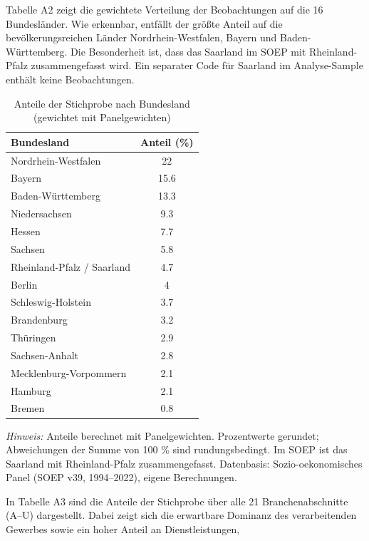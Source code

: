 Tabelle A2 zeigt die gewichtete Verteilung der Beobachtungen auf die 16 Bundesländer. Wie erkennbar, entfällt der größte Anteil auf die bevölkerungsreichen Länder Nordrhein-Westfalen, Bayern und Baden-Württemberg. Die Besonderheit ist, dass das Saarland im SOEP mit Rheinland-Pfalz zusammengefasst wird. Ein separater Code für Saarland im Analyse-Sample enthält keine Beobachtungen. 

\begin{table}[H]
\centering
\begin{threeparttable}
\caption{Anteile der Stichprobe nach Bundesland (gewichtet mit Panelgewichten)}
\label{tab:anhangC_bula}
\begin{tabular}{lc}
\toprule
\textbf{Bundesland} & \textbf{Anteil (\%)} \\
\midrule
Nordrhein-Westfalen & 22 \\
Bayern & 15.6 \\
Baden-Württemberg & 13.3 \\
Niedersachsen & 9.3 \\
Hessen & 7.7 \\
Sachsen & 5.8 \\
Rheinland-Pfalz / Saarland & 4.7 \\
Berlin & 4 \\
Schleswig-Holstein & 3.7 \\
Brandenburg & 3.2 \\
Thüringen & 2.9 \\
Sachsen-Anhalt & 2.8 \\
Mecklenburg-Vorpommern & 2.1 \\
Hamburg & 2.1 \\
Bremen & 0.8 \\\bottomrule
\end{tabular}
\begin{tablenotes}
\footnotesize
\item \textit{Hinweis:} Anteile berechnet mit Panelgewichten. 
Prozentwerte gerundet; Abweichungen der Summe von 100 \% sind rundungsbedingt. 
Im SOEP ist das Saarland mit Rheinland-Pfalz zusammengefasst. 
Datenbasis: Sozio-oekonomisches Panel (SOEP v39, 1994--2022), eigene Berechnungen.
\end{tablenotes}
\end{threeparttable}
\end{table}
In Tabelle A3 sind die Anteile der Stichprobe über alle 
21 Branchenabschnitte (A--U) dargestellt. Dabei zeigt sich die erwartbare Dominanz 
des verarbeitenden Gewerbes sowie ein hoher Anteil an Dienstleistungen, 
